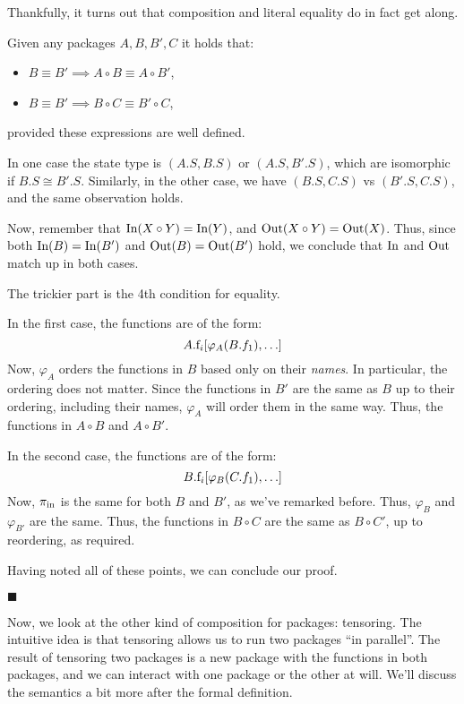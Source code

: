 Thankfully, it turns out that composition and literal equality do
in fact get along.

\begin{lemma}
    Given any packages $A, B, B', C$ it holds that:
    \begin{itemize}
        \item $B \equiv B' \implies A \circ B \equiv A \circ B'$,
        \item $B \equiv B' \implies B \circ C \equiv B' \circ C$,
    \end{itemize}
    provided these expressions are well defined.

     In one case the state type is $(A.S, B.S)$
    or $(A.S, B'.S)$, which are isomorphic if $B.S \cong B'.S$.
    Similarly, in the other case, we have $(B.S, C.S)$ vs $(B'.S, C.S)$,
    and the same observation holds.

    Now, remember that $\text{In}(X \circ Y) = \text{In}(Y)$, and $\text{Out}(X \circ Y) = \text{Out}(X)$.
    Thus, since both $\text{In}(B) = \text{In}(B')$ and $\text{Out}(B) = \text{Out}(B')$
    hold, we conclude that $\text{In}$ and $\text{Out}$ match up in both cases.

    The trickier part is the 4th condition for equality.

    In the first case, the functions are of the form:
    $$
    A.\text{f}_i[\varphi_A(B.f_1), \ldots]
    $$
    Now, $\varphi_A$ orders the functions in $B$ based only on their \emph{names}.
    In particular, the ordering does not matter.
    Since the functions in $B'$ are the same as $B$ up to their ordering,
    including their names,
    $\varphi_A$ will order them in the same way.
    Thus, the functions in $A \circ B$ and $A \circ B'$.

    In the second case, the functions are of the form:
    $$
    B.\text{f}_i[\varphi_B(C.f_1), \ldots]
    $$
    Now, $\pi_{\text{in}}$ is the same for both $B$ and $B'$, as we've remarked
    before.
    Thus, $\varphi_B$ and $\varphi_{B'}$ are the same.
    Thus, the functions in $B \circ C$ are the same as $B \circ C'$,
    up to reordering, as required.

    Having noted all of these points, we can conclude our proof.

    $\blacksquare$
\end{lemma}

Now, we look at the other kind of composition for packages:
tensoring.
The intuitive idea is that tensoring allows us to run two
packages ``in parallel''.
The result of tensoring two packages is a new package with the functions
in both packages, and we can interact with one package or the other at will.
We'll discuss the semantics a bit more after the formal definition.


